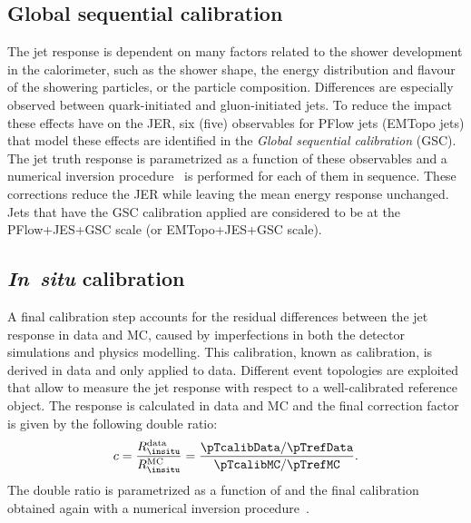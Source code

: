 \subsection{Global sequential calibration}
The jet response is dependent on many factors related to the shower development in the calorimeter, such as the shower shape, the energy distribution and flavour of the showering particles, or the particle composition. 
Differences are especially observed between quark-initiated and gluon-initiated jets. 
To reduce the impact these effects have on the JER, six (five) observables for PFlow jets (EMTopo jets) that model these effects are identified in the \emph{Global sequential calibration} (GSC). The jet truth response is parametrized as a function of these observables and a numerical inversion procedure~\cite{PERF-2011-03} is performed for each of them in sequence.
These corrections reduce the JER while leaving the mean energy response unchanged. 
Jets that have the GSC calibration applied are considered to be at the PFlow+JES+GSC scale (or EMTopo+JES+GSC scale).

\subsection{\textbf{\emph{In~situ}} calibration}
\label{subsec:insitu-calibration}
A final calibration step accounts for the residual differences between the jet response in data and MC, caused by imperfections in both the detector simulations and physics modelling. This calibration, known as \insitu calibration, is derived in data and only applied to data. 
Different event topologies are exploited that allow to measure the jet response with respect to a well-calibrated reference object. The \insitu response is calculated in data and MC and the final correction factor is given by the following double ratio:
\begin{equation}
    c = \frac{R_{\insitu}^{\text{data}}}{R_{\insitu}^{\text{MC}}} = \frac{ \pTcalibData / \pTrefData}{\pTcalibMC / \pTrefMC}.
\end{equation}
The double ratio is parametrized as a function of \pTref and the final calibration obtained again with a numerical inversion procedure~\cite{PERF-2011-03}.


